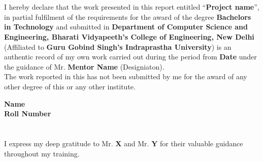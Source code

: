 \documentclass[11pt, oneside]{book}
\begin{document}

\justify

\chapter*{}
    
      \normalsize I hereby declare that the work presented in this report entitled “\textbf {Project name}”, in partial fulfilment of the requirements for the award of the degree \textbf{Bachelors in Technology} and submitted in \textbf{Department of Computer Science and Engineering, Bharati Vidyapeeth’s College of Engineering, New Delhi} (Affiliated to \textbf{Guru Gobind Singh’s Indraprastha University}) is an authentic record of my own work carried out during the period from \textbf{Date} under the guidance of Mr. \textbf{Mentor Name} (Designiaton).\\[.75cm]

     The work reported in this has not been submitted by me for the award of any other degree of this or any other institute.\\[.75cm]

    \begin{flushright}
        \textbf{
            Name\\
            Roll Number
        }
    \end{flushright}

\chapter*{}

    \normalsize
    I express my deep gratitude to Mr. \textbf{X} and Mr. \textbf{Y} for their valuable guidance throughout my training.\\[.75cm]
\end{document}
